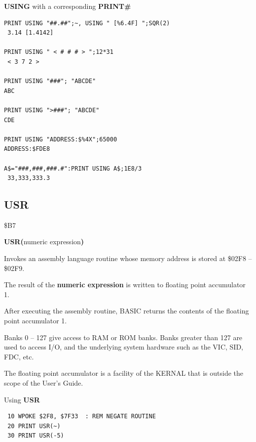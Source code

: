 \begin{description}[leftmargin=2cm,style=nextline]
\newpage
\item [Example:] {\bf USING} with a corresponding {\bf PRINT\#}

\begin{tcolorbox}[colback=black,coltext=white]
\verbatimfont{\codefont}
\begin{verbatim}
PRINT USING "##.##";~, USING " [%6.4F] ";SQR(2)
 3.14 [1.4142]

PRINT USING " < # # # > ";12*31
 < 3 7 2 >

PRINT USING "###"; "ABCDE"
ABC

PRINT USING ">###"; "ABCDE"
CDE

PRINT USING "ADDRESS:$%4X";65000
ADDRESS:$FDE8

A$="###,###,###.#":PRINT USING A$;1E8/3
 33,333,333.3
\end{verbatim}
\end{tcolorbox}
\end{description}


\newpage
\subsection{USR}
\begin{description}[leftmargin=2cm,style=nextline]
\item [Token:] \$B7
\item [Format:] {\bf USR(}numeric expression{\bf)}
\item [Usage:] Invokes an assembly language routine whose memory
               address is stored at  \$02F8 -- \$02F9.

               The result of the {\bf numeric expression}
               is written to floating point accumulator 1.

               After executing the assembly routine, BASIC returns
               the contents of the floating point accumulator 1.

\item [Remarks:] Banks 0 -- 127 give access to RAM or ROM banks.
                 Banks greater than 127 are used to access I/O, and the underlying system hardware such as the
                 VIC, SID, FDC, etc.

                 The floating point accumulator is a facility of the KERNAL
                 that is outside the scope of the User's Guide.

\item [Example:] Using {\bf USR}

\begin{tcolorbox}[colback=black,coltext=white]
\verbatimfont{\codefont}
\begin{verbatim}
 10 WPOKE $2F8, $7F33  : REM NEGATE ROUTINE
 20 PRINT USR(~)
 30 PRINT USR(-5)
\end{verbatim}
\end{tcolorbox}
\end{description}

